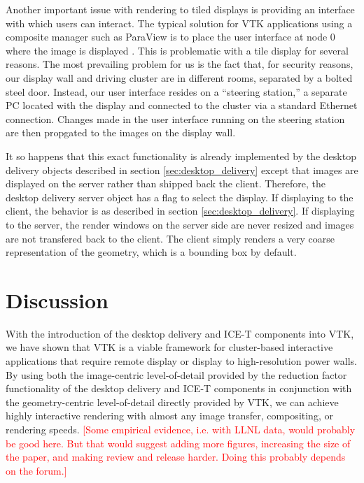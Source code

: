 \documentclass[twocolumn]{article}
\newcommand{\sticky}[1]{\textcolor{Red}{[#1]}}
\begin{document}
Another important issue with rendering to tiled displays is providing an
interface with which users can interact.  The typical solution for VTK
applications using a composite manager such as ParaView is to place the
user interface at node 0 where the image is displayed \cite{Law01}.  This
is problematic with a tile display for several reasons.  The most
prevailing problem for us is the fact that, for security reasons, our
display wall and driving cluster are in different rooms, separated by a
bolted steel door.  Instead, our user interface resides on a ``steering
station,'' a separate PC located with the display and connected to the
cluster via a standard Ethernet connection.  Changes made in the user
interface running on the steering station are then propgated to the images
on the display wall.

It so happens that this exact functionality is already implemented by the
desktop delivery objects described in section \ref{sec:desktop_delivery}
except that images are displayed on the server rather than shipped back the
client.  Therefore, the desktop delivery server object has a flag to select
the display.  If displaying to the client, the behavior is as described in
section \ref{sec:desktop_delivery}.  If displaying to the server, the
render windows on the server side are never resized and images are not
transfered back to the client.  The client simply renders a very coarse
representation of the geometry, which is a bounding box by default.


\section{Discussion}
\label{sec:discussion}

With the introduction of the desktop delivery and ICE-T components into
VTK, we have shown that VTK is a viable framework for cluster-based
interactive applications that require remote display or display to
high-resolution power walls.  By using both the image-centric
level-of-detail provided by the reduction factor functionality of the
desktop delivery and ICE-T components in conjunction with the
geometry-centric level-of-detail directly provided by VTK, we can achieve
highly interactive rendering with almost any image transfer, compositing,
or rendering speeds.  \sticky{Some empirical evidence, i.e. with LLNL data,
would probably be good here.  But that would suggest adding more figures,
increasing the size of the paper, and making review and release harder.
Doing this probably depends on the forum.}
\end{document}
